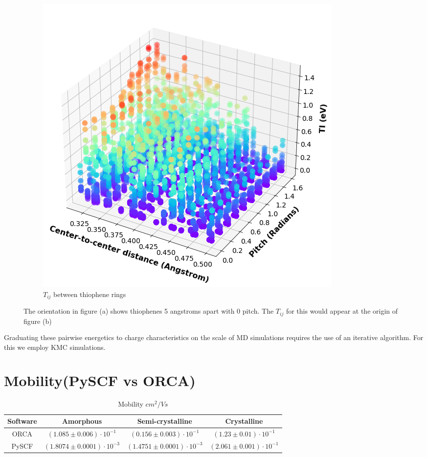 \begin{figure}[]
\begin{subfigure}{.8\textwidth}
    \includegraphics[width=\textwidth]{figures/transfer_integral_plot.png}
    \caption{$T_{ij}$ between thiophene rings}
\end{subfigure}
    \caption{The orientation in figure (a) shows thiophenes 5 angstroms apart with 0 pitch. The $T_{ij}$ for
    this would appear at the origin of figure (b)}
\label{TIplots}
\end{figure}

Graduating these pairwise energetics to charge characteristics on the scale of MD simulations
requires the use of an iterative algorithm. For this we employ KMC simulations.

\section{Mobility(PySCF vs ORCA)}

\begin{table}[ht]
    \caption{Mobility $cm^{2}/Vs$} %
\centering %
\begin{tabular}{c c c c} %
\hline\hline %
Software & Amorphous & Semi-crystalline & Crystalline \\ [0.5ex] %
\hline %
    ORCA & $(1.085 \pm 0.006)\cdot 10^{-1}$ & $(0.156 \pm 0.003)\cdot 10^{-1}$ & $(1.23 \pm 0.01)\cdot 10^{-1}$ \\ %
PySCF & $(1.8074 \pm 0.0001)\cdot 10^{-3}$ & $(1.4751 \pm 0.0001)\cdot 10^{-3}$ & $(2.061 \pm 0.001)\cdot 10^{-1}$  \\ [1ex] %
\hline %
\end{tabular}
\label{table:nonlin} %
\end{table}

